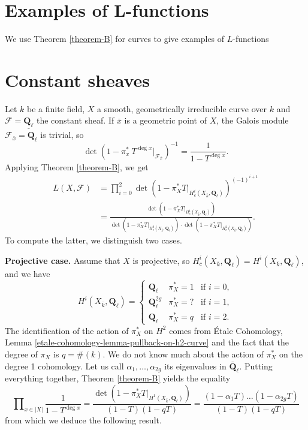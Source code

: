 \documentclass{stacks-project}
\theoremstyle{plain}
\theoremstyle{definition}
\theoremstyle{remark}
\numberwithin{equation}{subsection}
\begin{document}
\section{Examples of L-functions}
\label{section-examples-L-functions}

\noindent
We use Theorem \ref{theorem-B} for curves to give examples of $L$-functions





\section{Constant sheaves}
\label{section-L-function-constant-sheaf}

\noindent
Let $k$ be a finite field, $X$ a smooth, geometrically irreducible curve over
$k$ and $\mathcal{F} = \underline{\mathbf{Q}_\ell}$ the constant sheaf. If
$\bar x$ is a geometric point of $X$, the Galois module
$\mathcal{F}_{\bar x} = \mathbf{Q}_\ell$ is trivial, so
$$
\det(1-\pi_x^*\ T^{\deg x} |_{\mathcal{F}_{\bar x}})^{-1} =
\frac{1}{1-T^{\deg x}}.
$$
Applying Theorem \ref{theorem-B}, we get
\begin{align*}
L(X, \mathcal{F})
& =
\prod_{i = 0}^2
\det(1 - \pi_X^*T |_{H_c^i(X_{\bar k}, \mathbf{Q}_\ell)})^{(-1)^{i+1}} \\
& =
\frac{\det(1 - \pi_X^*T |_{H_c^1(X_{\bar k}, \mathbf{Q}_\ell)})}{
\det(1 - \pi_X^*T |_{H_c^0(X_{\bar k}, \mathbf{Q}_\ell)})
\cdot \det(1 - \pi_X^*T |_{H_c^2(X_{\bar k}, \mathbf{Q}_\ell)})}.
\end{align*}
To compute the latter, we distinguish two cases.


\medskip\noindent
{\bf Projective case.}
Assume that $X$ is projective, so $H_c^i(X_{\bar k}, \mathbf{Q}_\ell) =
H^i(X_{\bar k}, \mathbf{Q}_\ell)$, and we have
$$
H^i(X_{\bar k}, \mathbf{Q}_\ell) =
\left\{
\begin{matrix}
\mathbf{Q}_\ell & \pi_X^* = 1 & \text{if }i = 0, \\
\mathbf{Q}_\ell^{2g} & \pi_X^* = ? & \text{if }i = 1, \\
\mathbf{Q}_\ell & \pi_X^* = q & \text{if }i = 2.
\end{matrix}
\right.
$$
The identification of the action of $\pi_X^*$ on $H^2$ comes from
\'Etale Cohomology, Lemma \ref{etale-cohomology-lemma-pullback-on-h2-curve}
and the fact that the degree
of $\pi_X$ is $q = \#(k)$.
We do not know much about the action of $\pi_X^*$ on the degree 1 cohomology.
Let us call $\alpha_1, \ldots, \alpha_{2g}$ its eigenvalues in
$\bar{\mathbf{Q}}_\ell$. Putting everything together,
Theorem \ref{theorem-B}
yields the equality
$$
\prod\nolimits_{x \in |X|} \frac{1}{1 - T^{\deg x}} =
\frac{\det(1- \pi_X^* T|_{H^1(X_{\bar k}, \mathbf{Q}_\ell)})}{(1-T)(1-qT)} =
\frac{(1 - \alpha_1 T) \ldots (1 - \alpha_{2g}T)}{(1-T)(1-qT)}
$$
from which we deduce the following result.
\end{document}
